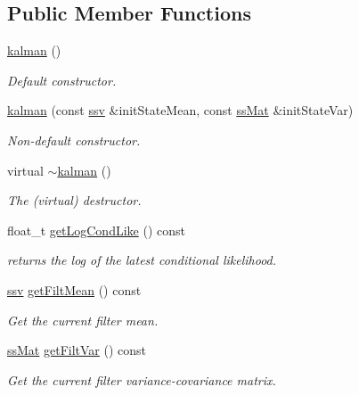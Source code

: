 \subsection*{Public Member Functions}
\begin{DoxyCompactItemize}
\item 
\hyperlink{classkalman_a8b05d79f154bf5669457a3e95f7323d5}{kalman} ()
\begin{DoxyCompactList}\small\item\em Default constructor. \end{DoxyCompactList}\item 
\hyperlink{classkalman_a91ec8bcb52e26df651001d8f8e574373}{kalman} (const \hyperlink{classcf__filter_ad4bce534d6b7a494dae851846037c94b}{ssv} \&init\+State\+Mean, const \hyperlink{classkalman_a581550d9aba33245fb496b22a834831c}{ss\+Mat} \&init\+State\+Var)
\begin{DoxyCompactList}\small\item\em Non-\/default constructor. \end{DoxyCompactList}\item 
\mbox{\label{classkalman_ae9284574db789ce2d961b6fe62d80fac}} 
virtual \hyperlink{classkalman_ae9284574db789ce2d961b6fe62d80fac}{$\sim$kalman} ()
\begin{DoxyCompactList}\small\item\em The (virtual) destructor. \end{DoxyCompactList}\item 
float\+\_\+t \hyperlink{classkalman_aaf359a2d65f4f0ae8eb26603205b6f9b}{get\+Log\+Cond\+Like} () const
\begin{DoxyCompactList}\small\item\em returns the log of the latest conditional likelihood. \end{DoxyCompactList}\item 
\hyperlink{classcf__filter_ad4bce534d6b7a494dae851846037c94b}{ssv} \hyperlink{classkalman_a247a3cef3a1fcec8c858372014276acf}{get\+Filt\+Mean} () const
\begin{DoxyCompactList}\small\item\em Get the current filter mean. \end{DoxyCompactList}\item 
\hyperlink{classkalman_a581550d9aba33245fb496b22a834831c}{ss\+Mat} \hyperlink{classkalman_af88f227e98383b222dc765b11df626c1}{get\+Filt\+Var} () const
\begin{DoxyCompactList}\small\item\em Get the current filter variance-\/covariance matrix. \end{DoxyCompactList}\item 

\end{DoxyCompactItemize}
